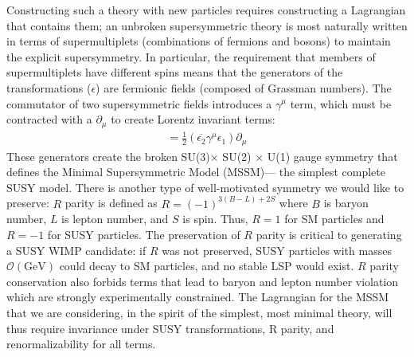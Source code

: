 Constructing such a theory with new particles requires constructing a Lagrangian that contains them; an unbroken supersymmetric theory is most naturally written in terms of supermultiplets (combinations of fermions and bosons) to maintain the explicit supersymmetry. In particular, the requirement that members of supermultiplets have different spins means that the generators of the transformations ($\epsilon$) are fermionic fields (composed of Grassman numbers). The commutator of two supersymmetric fields introduces a $\gamma^\mu$ term, which must be contracted with a $\partial_\mu$ to create Lorentz invariant terms:
\begin{align}
  [\delta(\epsilon_1),\delta(\epsilon_2)] = \frac{1}{2} \left( \overline{\epsilon_2} \gamma^\mu \epsilon_1\right)\partial_\mu
\end{align}
These generators create the broken SU(3)$\times$ SU(2) $\times$ U(1) gauge symmetry that defines the Minimal Supersymmetric Model (MSSM)--- the simplest complete SUSY model. There is another type of well-motivated symmetry we would like to preserve: \cite[p.~231]{Jungman} $R$ parity is defined as $R = (-1)^{3(B-L)+2S}$ where $B$ is baryon number, $L$ is lepton number, and $S$ is spin. Thus, $R = 1$ for SM particles and $R = -1$ for SUSY particles. The preservation of $R$ parity is critical to generating a SUSY WIMP candidate: if $R$ was not preserved, SUSY particles with masses $\mathcal{O}(\mathrm{GeV})$ could decay to SM particles, and no stable LSP would exist. $R$ parity conservation also forbids terms that lead to baryon and lepton number violation which are strongly experimentally constrained. The Lagrangian for the MSSM that we are considering, in the spirit of the simplest, most minimal theory, will thus require invariance under SUSY transformations, R parity, and renormalizability for all terms. \cite[p.~231]{Jungman} 


